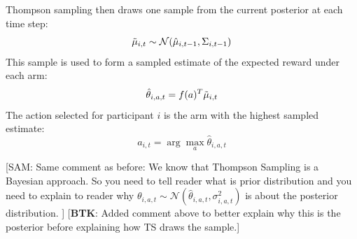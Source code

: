 \documentclass[letterpaper, 9pt]{extarticle}
\newcommand{\sam}[1]{
  {\color{blue} [SAM: {#1}]}
 }
\newcommand{\btk}[1]{%
  {\color{red} [\textbf{BTK}: {#1}]}%
}
\begin{document}
Thompson sampling then draws one sample from the current posterior at each time step:
\[
\Tilde{\mu}_{i,t} \sim \mathcal{N}(\hat{\mu}_{i,t-1}, \Sigma_{i,t-1})
\]
This sample is used to form a sampled estimate of the expected reward under each arm:
\[
\hat{\theta}_{i,a,t} = f(a)^T \Tilde{\mu}_{i,t} 
\]
The action selected for participant $i$ is the arm with the highest sampled estimate:
\[
a_{i,t} = \arg\max_a \hat{\theta}_{i,a,t} 
\]





\sam{Same comment as before:  We know that Thompson Sampling is a Bayesian approach.  So you need to tell reader what is prior distribution and you need to explain to reader why $\theta_{i,a,t} \sim \mathcal{N} (\hat{\theta}_{i,a,t}, \sigma_{i,a,t}^2)$  is about the posterior distribution.
} \btk{Added comment above to better explain why this is the posterior before explaining how TS draws the sample.}
\end{document}
